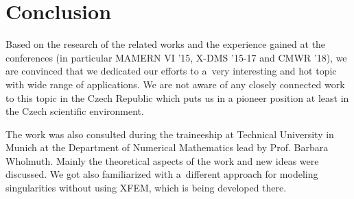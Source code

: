 \documentclass[bibliography=totocnumbered,dvipsnames,FM,Dis]{tulthesis}
\begin{document}



\chapter{Conclusion} \label{chap:summary}

Based on the research of the related works and the experience gained at the conferences
(in particular MAMERN VI '15, X-DMS '15-17 and CMWR '18),
we are convinced that we dedicated our efforts to a~very interesting and hot topic with wide range of applications.
We are not aware of any closely connected work to this topic in the Czech Republic
which puts us in a pioneer position at least in the Czech scientific environment.



The work was also consulted during the traineeship at Technical University in Munich at the Department of Numerical Mathematics
lead by Prof. Barbara Wholmuth. Mainly the theoretical aspects of the work and new ideas were discussed.
We got also familiarized with a~different approach for modeling singularities without using XFEM, which is being developed there.
\end{document}
